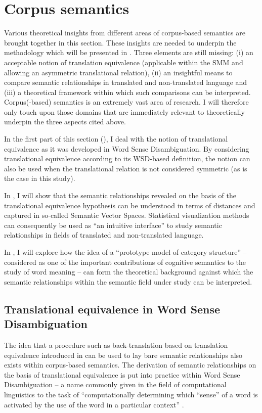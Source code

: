 \section{Corpus semantics}
\label{sec:2.4}  
Various theoretical insights from different areas of corpus-based semantics are brought together in this section. These insights are needed to underpin the methodology which will be presented in . Three elements are still missing: (i) an acceptable notion of translation equivalence (applicable within the SMM and allowing an asymmetric translational relation), (ii) an insightful means to compare semantic relationships in translated and non-translated language and (iii) a theoretical framework within which such comparisons can be interpreted. Corpus(-based) semantics is an extremely vast area of research. I will therefore only touch upon those domains that are immediately relevant to theoretically underpin the three aspects cited above.

In the first part of this section (), I deal with the notion of translational equivalence as it was developed in Word Sense Disambiguation. By considering translational equivalence according to its WSD-based definition, the notion can also be used when the translational relation is not considered symmetric (as is the case in this study).

In , I will show that the semantic relationships revealed on the basis of the translational equivalence hypothesis can be understood in terms of distances and captured in so-called Semantic Vector Spaces. Statistical visualization methods can consequently be used as “an intuitive interface” \citep*[17]{heylen_looking_2012} to study semantic relationships in fields of translated and non-translated language.

In , I will explore how the idea of a “prototype model of category structure” – considered as one of the important contributions of cognitive semantics to the study of word meaning \citep[577]{allan_lexical_2013} – can form the theoretical background against which the semantic relationships within the semantic field under study can be interpreted.

\subsection{Translational equivalence in Word Sense Disambiguation}
\label{sec:2.4.1}  
The idea that a procedure such as back-translation based on translation equivalence introduced in  can be used to lay bare semantic relationships also exists within corpus-based semantics. The derivation of semantic relationships on the basis of translational equivalence is put into practice within Word Sense Disambiguation – a name commonly given in the field of computational linguistics to the task of “computationally determining which “sense” of a word is activated by the use of the word in a particular context” \citep[1]{agirre_word_2007}.

